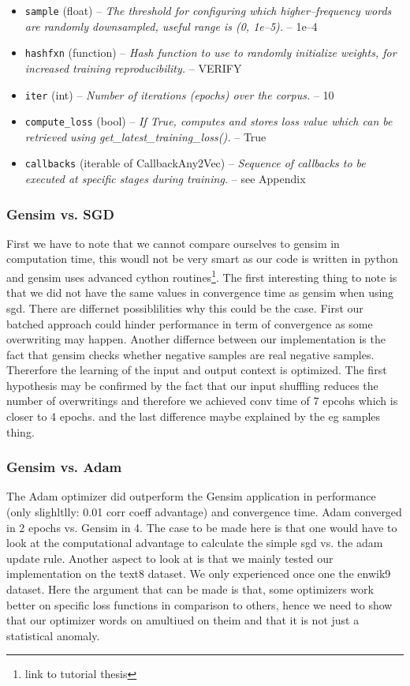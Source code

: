 \begin{itemize}
 \item   \texttt{sample} (float) --\textit{ The threshold for configuring which higher--frequency words are randomly downsampled, useful range is (0, 1e--5). }-- 1e--4
   \item \texttt{hashfxn} (function) --\textit{ Hash function to use to randomly initialize weights, for increased training reproducibility. }-- VERIFY 
  \item  \texttt{iter} (int) --\textit{ Number of iterations (epochs) over the corpus. }-- 10 
 \
  \item  \texttt{compute\_loss} (bool) --\textit{ If True, computes and stores loss value which can be retrieved using get\_latest\_training\_loss(). }-- True
 \item   \texttt{callbacks} (iterable of CallbackAny2Vec) --\textit{ Sequence of callbacks to be executed at specific stages during training. }-- see Appendix
\end{itemize}

\subsubsection{Gensim vs. SGD}
First we have to note that we cannot compare ourselves to gensim in computation time, this woudl not be very smart as our code is written in python and gensim uses advanced cython routines\footnote{link to tutorial thesis}. 
The first interesting thing to note is that we did not have the same values in convergence time as gensim when using sgd. There are differnet possiblilities why this could be the case. First our batched approach could hinder performance in term of convergence as some overwriting may happen. Another differnce between our implementation is the fact that gensim checks whether negative samples are real negative samples. Thererfore the learning of the input and output context is optimized. 
The first hypothesis may be confirmed by the fact that our input shuffling reduces the number of overwritings and therefore we achieved conv time of 7 epcohs which is closer to 4 epochs. and the last difference maybe explained by the eg samples thing. 

\subsubsection{Gensim vs. Adam}
The Adam optimizer did outperform the Gensim application in performance (only slighltlly: 0.01 corr coeff advantage) and convergence time. Adam converged in 2 epochs vs. Gensim in 4. The case to be made here is that one would have to look at the computational advantage to calculate the simple sgd vs.  the adam update rule. Another aspect to look at is that we mainly tested our implementation on the text8 dataset. We only experienced once one the enwik9 dataset. Here the argument that can be made is that, some optimizers work better on specific loss functions in comparison to others, hence we need to show that our optimizer words on amultiued on theim and that it is not just a statistical anomaly.

